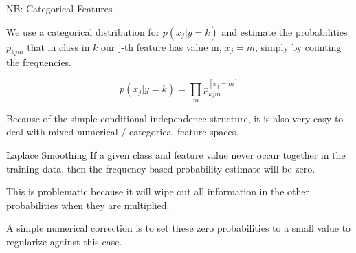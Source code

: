 \documentclass[11pt,compress,t,notes=noshow, xcolor=table]{beamer}
\begin{document}
\begin{vbframe}{NB: Categorical Features}

  We use a categorical distribution for $p(x_j | y = k)$ and estimate the probabilities $p_{kjm}$ that in class in $k$ our j-th feature has value m, $x_j = m$, simply by counting the frequencies.

$$
p(x_j | y = k) = \prod_m p_{kjm}^{[x_j = m]}
$$
%
%


Because of the simple conditional independence structure, it is also very easy to deal with mixed numerical / categorical feature spaces.

\end{vbframe}






\begin{vbframe}{Laplace Smoothing}
If a given class and feature value never occur together in the training data, then the frequency-based probability estimate will be zero.

\lz

This is problematic because it will wipe out all information in the other probabilities when they are multiplied.

\lz
%
A simple numerical correction is to set these zero probabilities to a small value to regularize against this case.


\end{vbframe}


\end{document}
